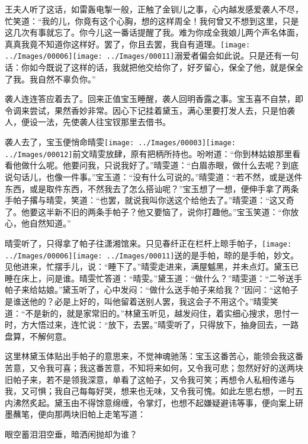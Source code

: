 王夫人听了这话，如雷轰电掣一般，正触了金钏儿之事，心内越发感爱袭人不尽，忙笑道：``我的儿，你竟有这个心胸，想的这样周全！我何曾又不想到这里，只是这几次有事就忘了。你今儿这一番话提醒了我。难为你成全我娘儿两个声名体面，真真我竟不知道你这样好。罢了，你且去罢，我自有道理。{\texttt{[image: ../Images/00006]}\texttt{[image: ../Images/00011]}\footnotesize \kaishu 溺爱者偏会如此说。}只是还有一句话：你如今既说了这样的话，我就把他交给你了，好歹留心，保全了他，就是保全了我。我自然不辜负你。''

袭人连连答应着去了。回来正值宝玉睡醒，袭人回明香露之事。宝玉喜不自禁，即令调来尝试，果然香妙非常。因心下记挂着黛玉，满心里要打发人去，只是怕袭人，便设一法，先使袭人往宝钗那里去借书。

袭人去了，宝玉便悄命晴雯{\texttt{[image: ../Images/00003]}\texttt{[image: ../Images/00012]}\footnotesize \kaishu 前文晴雯放肆，原有把柄所持也。}吩咐道：``你到林姑娘那里看看他做什么呢。他要问我，只说我好了。''晴雯道：``白眉赤眼，做什么去呢？到底说句话儿，也像一件事。''宝玉道：``没有什么可说的。''晴雯道：``若不然，或是送件东西，或是取件东西，不然我去了怎么搭讪呢？''宝玉想了一想，便伸手拿了两条手帕子撂与晴雯，笑道：``也罢，就说我叫你送这个给他去了。''晴雯道：``这又奇了。他要这半新不旧的两条手帕子？他又要恼了，说你打趣他。''宝玉笑道：``你放心，他自然知道。''

晴雯听了，只得拿了帕子往潇湘馆来。只见春纤正在栏杆上晾手帕子，{\texttt{[image: ../Images/00006]}\texttt{[image: ../Images/00011]}\footnotesize \kaishu 送的是手帕，晾的是手帕，妙文。}见他进来，忙摆手儿，说：``睡下了。''晴雯走进来，满屋魆黑，并未点灯。黛玉已睡在床上，问是谁。晴雯忙答道：``晴雯。''黛玉道：``做什么？''晴雯道：``二爷送手帕子来给姑娘。''黛玉听了，心中发闷：``做什么送手帕子来给我？''因问：``这帕子是谁送他的？必是上好的，叫他留着送别人罢，我这会子不用这个。''晴雯笑道：``不是新的，就是家常旧的。''林黛玉听见，越发闷住，着实细心搜求，思忖一时，方大悟过来，连忙说：``放下，去罢。''晴雯听了，只得放下，抽身回去，一路盘算，不解何意。

这里林黛玉体贴出手帕子的意思来，不觉神魂驰荡：宝玉这番苦心，能领会我这番苦意，又令我可喜；我这番苦意，不知将来如何，又令我可悲；忽然好好的送两块旧帕子来，若不是领我深意，单看了这帕子，又令我可笑；再想令人私相传递与我，又可惧；我自己每每好哭，想来也无味，又令我可愧。如此左思右想，一时五内沸然炙起。黛玉由不得馀意绵缠，令掌灯，也想不起嫌疑避讳等事，便向案上研墨蘸笔，便向那两块旧帕上走笔写道：

眼空蓄泪泪空垂，暗洒闲抛却为谁？

